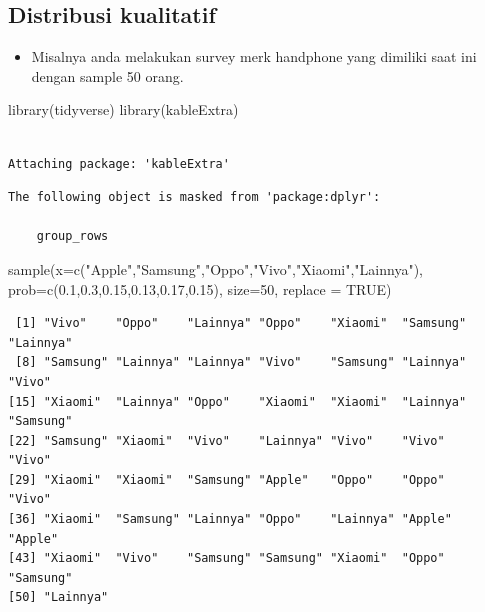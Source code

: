 \documentclass[
  letterpaper,
  DIV=11,
  numbers=noendperiod]{scrartcl}
\newenvironment{Shaded}{\begin{snugshade}}{\end{snugshade}}
\newcommand{\AttributeTok}[1]{\textcolor[rgb]{0.40,0.45,0.13}{#1}}
\newcommand{\ConstantTok}[1]{\textcolor[rgb]{0.56,0.35,0.01}{#1}}
\newcommand{\DecValTok}[1]{\textcolor[rgb]{0.68,0.00,0.00}{#1}}
\newcommand{\FloatTok}[1]{\textcolor[rgb]{0.68,0.00,0.00}{#1}}
\newcommand{\FunctionTok}[1]{\textcolor[rgb]{0.28,0.35,0.67}{#1}}
\newcommand{\NormalTok}[1]{\textcolor[rgb]{0.00,0.23,0.31}{#1}}
\newcommand{\StringTok}[1]{\textcolor[rgb]{0.13,0.47,0.30}{#1}}
\providecommand{\tightlist}{%
  \setlength{\itemsep}{0pt}\setlength{\parskip}{0pt}}\usepackage{longtable,booktabs,array}
\begin{document}
\subsection{Distribusi kualitatif}\label{distribusi-kualitatif}

\begin{itemize}
\tightlist
\item
  Misalnya anda melakukan survey merk handphone yang dimiliki saat ini
  dengan sample 50 orang.
\end{itemize}

\begin{Shaded}
\begin{Highlighting}[]
\FunctionTok{library}\NormalTok{(tidyverse)}
\FunctionTok{library}\NormalTok{(kableExtra)}
\end{Highlighting}
\end{Shaded}

\begin{verbatim}

Attaching package: 'kableExtra'
\end{verbatim}

\begin{verbatim}
The following object is masked from 'package:dplyr':

    group_rows
\end{verbatim}

\begin{Shaded}
\begin{Highlighting}[]
\FunctionTok{sample}\NormalTok{(}\AttributeTok{x=}\FunctionTok{c}\NormalTok{(}\StringTok{"Apple"}\NormalTok{,}\StringTok{"Samsung"}\NormalTok{,}\StringTok{"Oppo"}\NormalTok{,}\StringTok{"Vivo"}\NormalTok{,}\StringTok{"Xiaomi"}\NormalTok{,}\StringTok{"Lainnya"}\NormalTok{),}
                      \AttributeTok{prob=}\FunctionTok{c}\NormalTok{(}\FloatTok{0.1}\NormalTok{,}\FloatTok{0.3}\NormalTok{,}\FloatTok{0.15}\NormalTok{,}\FloatTok{0.13}\NormalTok{,}\FloatTok{0.17}\NormalTok{,}\FloatTok{0.15}\NormalTok{),}
                      \AttributeTok{size=}\DecValTok{50}\NormalTok{,}
                      \AttributeTok{replace =} \ConstantTok{TRUE}\NormalTok{)}
\end{Highlighting}
\end{Shaded}

\begin{verbatim}
 [1] "Vivo"    "Oppo"    "Lainnya" "Oppo"    "Xiaomi"  "Samsung" "Lainnya"
 [8] "Samsung" "Lainnya" "Lainnya" "Vivo"    "Samsung" "Lainnya" "Vivo"   
[15] "Xiaomi"  "Lainnya" "Oppo"    "Xiaomi"  "Xiaomi"  "Lainnya" "Samsung"
[22] "Samsung" "Xiaomi"  "Vivo"    "Lainnya" "Vivo"    "Vivo"    "Vivo"   
[29] "Xiaomi"  "Xiaomi"  "Samsung" "Apple"   "Oppo"    "Oppo"    "Vivo"   
[36] "Xiaomi"  "Samsung" "Lainnya" "Oppo"    "Lainnya" "Apple"   "Apple"  
[43] "Xiaomi"  "Vivo"    "Samsung" "Samsung" "Xiaomi"  "Oppo"    "Samsung"
[50] "Lainnya"
\end{verbatim}
\end{document}
